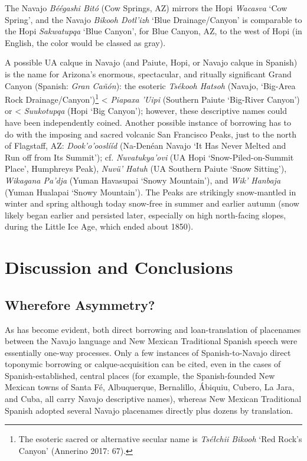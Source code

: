 The Navajo \textit{Béégashi Bitó} (Cow Springs, AZ) mirrors the Hopi \textit{Wacasva }‘Cow Spring’, and the Navajo\textit{ Bikooh Dotl'izh} ‘Blue Drainage/Canyon’ is comparable to the Hopi \textit{Sakwatupqa} ‘Blue Canyon’, for Blue Canyon, AZ, to the west of Hopi (in English, the color would be classed as gray).

A possible UA calque in Navajo (and Paiute, Hopi, or Navajo calque in Spanish) is the name for Arizona’s enormous, spectacular, and ritually significant Grand Canyon (Spanish: \textit{Gran Cañón}): the esoteric  \textit{Tsékooh Hatsoh} (Navajo, ‘Big-Area Rock Drainage/Canyon’)\footnote{The esoteric sacred or alternative secular name is \textit{Tséłchii Bikooh} `Red Rock's Canyon' (Annerino 2017: 67).} {\textless} \textit{Piapaxa ’Uipi} (Southern Paiute ‘Big-River Canyon’) or {\textless} \textit{Suukotupqa} (Hopi ‘Big Canyon’); however, these descriptive names could have been independently coined.  Another possible instance of borrowing has to do with the imposing and sacred volcanic San Francisco Peaks, just to the north of Flagstaff, AZ: \textit{Dook'o'ooslííd} (Na-Denéan Navajo ‘It Has Never Melted and Run off from Its Summit’); cf. \textit{Nuvatukya'ovi }(UA Hopi ‘Snow-Piled-on-Summit Place’, Humphreys Peak), \textit{Nuvü’ Hatuh} (UA Southern Paiute ‘Snow Sitting’), \textit{Wikagana Pa’dja} (Yuman Havasupai ‘Snowy Mountain’), and \textit{Wik’ Hanbaja} (Yuman Hualapai ‘Snowy Mountain’).  The Peaks are strikingly snow-mantled in winter and spring although today snow-free in summer and earlier autumn (snow likely began earlier and persisted later, especially on high north-facing slopes, during the Little Ice Age, which ended about 1850).

\section{Discussion and Conclusions}
\subsection{Wherefore Asymmetry?}
As has become evident, both direct borrowing and loan-translation of placenames between the Navajo language and New Mexican Traditional Spanish speech were essentially one-way processes.  Only a few instances of Spanish-to-Navajo direct toponymic borrowing or calque-acquisition can be cited, even in the cases of Spanish-established, central places (for example, the Spanish-founded New Mexican towns of Santa Fé, Albuquerque, Bernalillo, Ábiquiu, Cubero, La Jara, and Cuba, all carry Navajo descriptive names), whereas New Mexican Traditional Spanish adopted several Navajo placenames directly plus dozens by translation.

